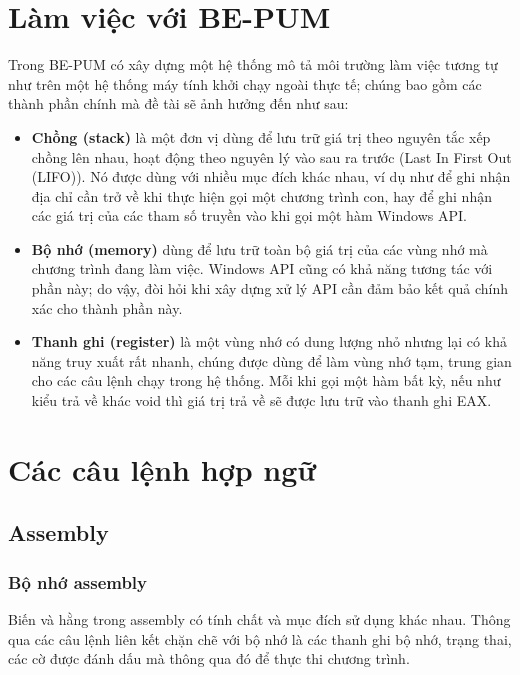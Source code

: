 \section{Làm việc với BE-PUM}

Trong BE-PUM có xây dựng một hệ thống mô tả môi trường làm việc tương tự như trên một hệ thống máy tính khởi chạy ngoài thực tế; chúng bao gồm các thành phần chính mà đề tài sẽ ảnh hưởng đến như sau:

\begin{itemize}
\item 	\textbf{Chồng (stack)} là một đơn vị dùng để lưu trữ giá trị theo nguyên tắc xếp chồng lên nhau, hoạt động theo nguyên lý vào sau ra trước (Last In First Out (LIFO)). Nó được dùng với nhiều mục đích khác nhau, ví dụ như để ghi nhận địa chỉ cần trở về khi thực hiện gọi một chương trình con, hay để ghi nhận các giá trị của các tham số truyền vào khi gọi một hàm Windows API.\\

\item 	\textbf{Bộ nhớ (memory)} dùng để lưu trữ toàn bộ giá trị của các vùng nhớ mà chương trình đang làm việc. Windows API cũng có khả năng tương tác với phần này; do vậy, đòi hỏi khi xây dựng xử lý API cần đảm bảo kết quả chính xác cho thành phần này.\\

\item 	\textbf{Thanh ghi (register)} là một vùng nhớ có dung lượng nhỏ nhưng lại có khả năng truy xuất rất nhanh, chúng được dùng để làm vùng nhớ tạm, trung gian cho các câu lệnh chạy trong hệ thống. Mỗi khi gọi một hàm bất kỳ, nếu như kiểu trả về khác void thì giá trị trả về sẽ được lưu trữ vào thanh ghi EAX.\\
\end{itemize}


\section{Các câu lệnh hợp ngữ}

	\subsection{Assembly}
	
		\subsubsection{Bộ nhớ assembly}	
		 Biến và hằng trong assembly có tính chất và mục đích sử dụng khác nhau. Thông qua các câu lệnh liên kết chặn chẽ với bộ nhớ là các thanh ghi bộ nhớ, trạng thai, các cờ được đánh dấu mà thông qua đó để thực thi chương trình.\\

